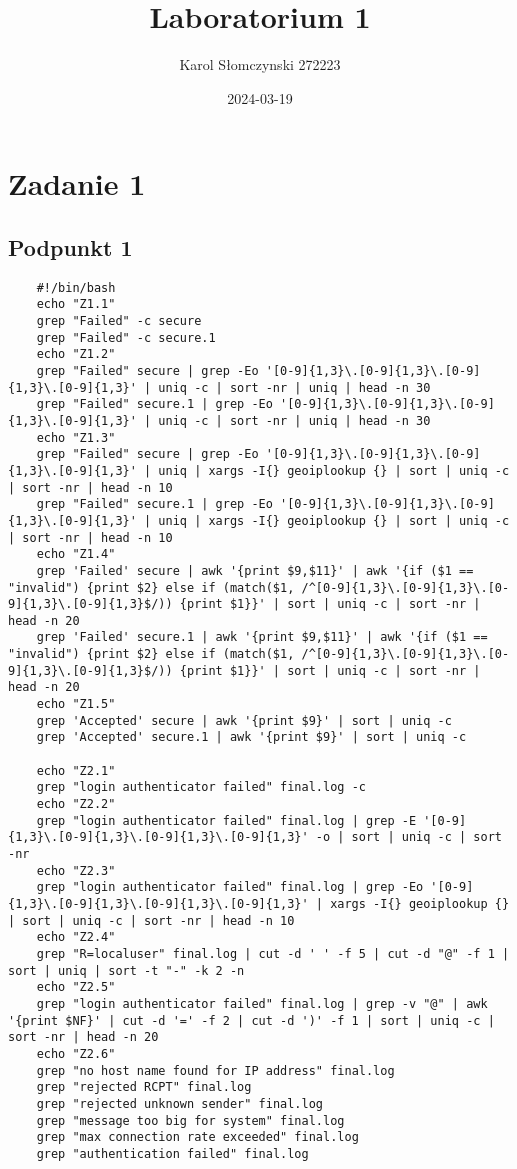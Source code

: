 \documentclass{article}
\title{Laboratorium 1}
\author{Karol Słomczynski 272223}
\date{2024-03-19}
\begin{document}
\maketitle


\section{Zadanie 1}
\subsection{Podpunkt 1}
\begin{verbatim}
    #!/bin/bash
    echo "Z1.1"
    grep "Failed" -c secure
    grep "Failed" -c secure.1 
    echo "Z1.2"
    grep "Failed" secure | grep -Eo '[0-9]{1,3}\.[0-9]{1,3}\.[0-9]{1,3}\.[0-9]{1,3}' | uniq -c | sort -nr | uniq | head -n 30
    grep "Failed" secure.1 | grep -Eo '[0-9]{1,3}\.[0-9]{1,3}\.[0-9]{1,3}\.[0-9]{1,3}' | uniq -c | sort -nr | uniq | head -n 30
    echo "Z1.3"
    grep "Failed" secure | grep -Eo '[0-9]{1,3}\.[0-9]{1,3}\.[0-9]{1,3}\.[0-9]{1,3}' | uniq | xargs -I{} geoiplookup {} | sort | uniq -c | sort -nr | head -n 10
    grep "Failed" secure.1 | grep -Eo '[0-9]{1,3}\.[0-9]{1,3}\.[0-9]{1,3}\.[0-9]{1,3}' | uniq | xargs -I{} geoiplookup {} | sort | uniq -c | sort -nr | head -n 10
    echo "Z1.4"
    grep 'Failed' secure | awk '{print $9,$11}' | awk '{if ($1 == "invalid") {print $2} else if (match($1, /^[0-9]{1,3}\.[0-9]{1,3}\.[0-9]{1,3}\.[0-9]{1,3}$/)) {print $1}}' | sort | uniq -c | sort -nr | head -n 20
    grep 'Failed' secure.1 | awk '{print $9,$11}' | awk '{if ($1 == "invalid") {print $2} else if (match($1, /^[0-9]{1,3}\.[0-9]{1,3}\.[0-9]{1,3}\.[0-9]{1,3}$/)) {print $1}}' | sort | uniq -c | sort -nr | head -n 20
    echo "Z1.5"
    grep 'Accepted' secure | awk '{print $9}' | sort | uniq -c
    grep 'Accepted' secure.1 | awk '{print $9}' | sort | uniq -c
    
    echo "Z2.1"
    grep "login authenticator failed" final.log -c
    echo "Z2.2"
    grep "login authenticator failed" final.log | grep -E '[0-9]{1,3}\.[0-9]{1,3}\.[0-9]{1,3}\.[0-9]{1,3}' -o | sort | uniq -c | sort -nr
    echo "Z2.3"
    grep "login authenticator failed" final.log | grep -Eo '[0-9]{1,3}\.[0-9]{1,3}\.[0-9]{1,3}\.[0-9]{1,3}' | xargs -I{} geoiplookup {} | sort | uniq -c | sort -nr | head -n 10
    echo "Z2.4"
    grep "R=localuser" final.log | cut -d ' ' -f 5 | cut -d "@" -f 1 | sort | uniq | sort -t "-" -k 2 -n
    echo "Z2.5"
    grep "login authenticator failed" final.log | grep -v "@" | awk '{print $NF}' | cut -d '=' -f 2 | cut -d ')' -f 1 | sort | uniq -c | sort -nr | head -n 20
    echo "Z2.6"
    grep "no host name found for IP address" final.log
    grep "rejected RCPT" final.log
    grep "rejected unknown sender" final.log
    grep "message too big for system" final.log
    grep "max connection rate exceeded" final.log
    grep "authentication failed" final.log
    
\end{verbatim}
\end{document}
